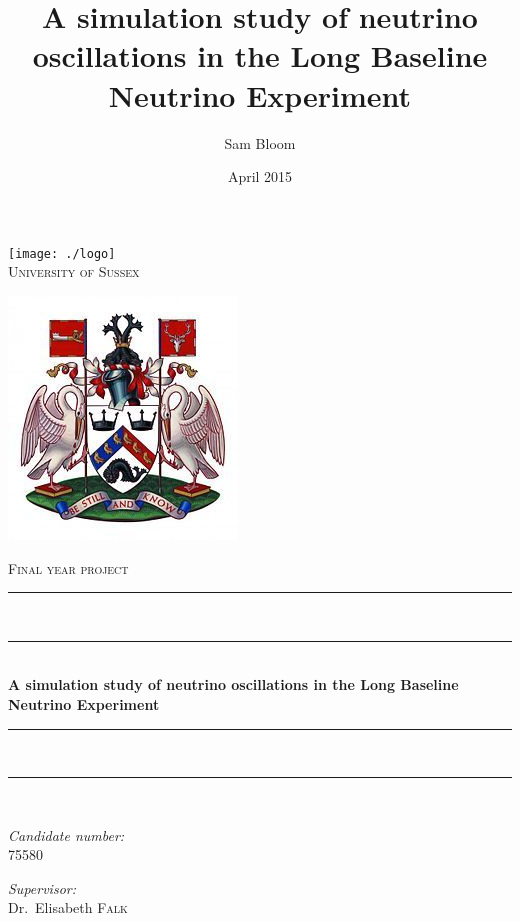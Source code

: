 \documentclass[12pt]{article}
\title{A simulation study of neutrino oscillations in the Long Baseline Neutrino Experiment}
\author{Sam Bloom }
\date{April 2015}
\newcommand{\HRule}{\rule{\linewidth}{0.5mm}}
\begin{document}
\begin{titlepage}
\begin{center}

\texttt{[image: ./logo]}~\\[1cm]

\textsc{\LARGE University of Sussex}\\[1.5cm]
\begin{center}
\includegraphics[scale=0.4]{University_of_Sussex_Coat_of_Arms.pdf}
\begin{figure}[h!]
\end{figure}
\end{center}
\textsc{\Large Final year project}\\[0.5cm]

\HRule \\[0.1cm]
\vspace{-4mm}
\HRule \\[0.4cm]
{ \huge \bfseries A simulation study of neutrino oscillations in the Long Baseline Neutrino Experiment \\[0.4cm] }

\HRule \\[0.1cm]
\vspace{-4mm}
\HRule \\[1.5cm]

\noindent
\begin{minipage}[t]{0.4\textwidth}
\begin{flushleft} \large
\emph{Candidate number:}\\
\textsc{75580}
\end{flushleft}
\end{minipage}%
\begin{minipage}[t]{0.4\textwidth}
\begin{flushright} \large
\emph{Supervisor:} \\
Dr.~Elisabeth \textsc{Falk}
\end{flushright}
\vspace{10mm}
\end{minipage}


\end{center}
\end{titlepage}
\end{document}

